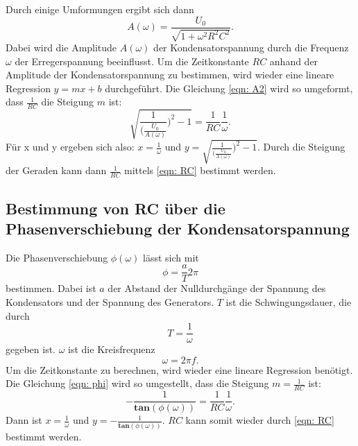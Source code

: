 Durch einige Umformungen ergibt sich dann 
\begin{equation}
A(\omega) = \frac{U_{0}}{\sqrt{1 + \omega^2 R^2 C^2}}.
\label{eqn: A2}
\end{equation}
Dabei wird die Amplitude $A(\omega)$ der Kondensatorspannung durch die Frequenz $\omega$ der Erregerspannung beeinflusst.
Um die Zeitkonstante $RC$ anhand der Amplitude der Kondensatorspannung zu bestimmen, wird wieder eine lineare Regression $y=mx+b$ durchgeführt. %
Die Gleichung \eqref{eqn: A2} wird so umgeformt, dass $\frac{1}{RC}$ die Steigung $m$ ist:
\begin{equation}
    \sqrt{\frac{1}{(\frac{U_{0}}{A(\omega)}})^2 -1} = \frac{1}{RC} \frac{1}{\omega}.
    \label{eqn: linreg2}
\end{equation}
Für x und y ergeben sich also: $x=\frac{1}{\omega}$ und $y=\sqrt{\frac{1}{(\frac{U_{0}}{A(\omega)}})^2 -1}$. %
Durch die Steigung der Geraden kann dann $\frac{1}{RC}$ mittels \eqref{eqn: RC} bestimmt werden.

\subsection{Bestimmung von RC über die Phasenverschiebung der Kondensatorspannung}
Die Phasenverschiebung $\phi(\omega)$ lässt sich mit
\begin{equation}
    \phi = \frac{a}{T}2\pi
\end{equation}
bestimmen. Dabei ist $a$ der Abstand der Nulldurchgänge der Spannung des Kondensators und der Spannung des Generators.
$T$ ist die Schwingungsdauer, die durch
\begin{equation*}
    T = \frac{1}{\omega}
\end{equation*}
gegeben ist. $\omega$ ist die Kreisfrequenz
\begin{equation*}
    \omega = 2\pi f.
\end{equation*}
Um die Zeitkonstante zu berechnen, wird wieder eine lineare Regression benötigt.
Die Gleichung \eqref{eqn: phi} wird so umgestellt, dass die Steigung $m = \frac{1}{RC}$ ist:
\begin{equation}
    -\frac{1}{\mathbf{tan}(\phi(\omega))} = \frac{1}{RC} \frac{1}{\omega}.
    \label{eqn: linreg3} 
\end{equation}
Dann ist $x= \frac{1}{\omega}$ und $y= -\frac{1}{\mathbf{tan}(\phi(\omega))}$.
$RC$ kann somit wieder durch \eqref{eqn: RC} bestimmt werden.

